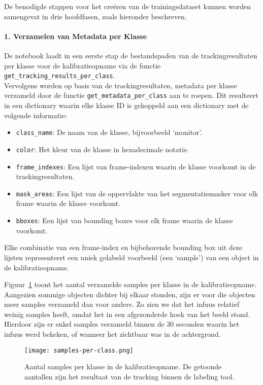 De benodigde stappen voor het creëren van de trainingsdataset kunnen worden samengevat in drie hoofdfasen, zoals hieronder beschreven.

\paragraph{1. Verzamelen van Metadata per Klasse}

De notebook laadt in een eerste stap de bestandspaden van de trackingresultaten per klasse 
voor de kalibratieopname via de functie\\ \texttt{get\_tracking\_results\_per\_class}.\\
Vervolgens worden op basis van de trackingresultaten, metadata per klasse verzameld door de functie \texttt{get\_metadata\_per\_class} aan te roepen.
Dit resulteert in een dictionary waarin elke klasse ID is gekoppeld aan een dictionary met de volgende informatie:
\begin{itemize}
    \item \texttt{class\_name}: De naam van de klasse, bijvoorbeeld `monitor'.
    \item \texttt{color}: Het kleur van de klasse in hexadecimale notatie.
    \item \texttt{frame\_indexes}: Een lijst van frame-indexen waarin de klasse voorkomt in de trackingresultaten.
    \item \texttt{mask\_areas}: Een lijst van de oppervlakte van het segmentatiemasker voor elk frame waarin de klasse voorkomt.
    \item \texttt{bboxes}: Een lijst van bounding boxes voor elk frame waarin de klasse voorkomt.
\end{itemize}
Elke combinatie van een frame-index en bijbehorende bounding box uit deze lijsten representeert 
een uniek gelabeld voorbeeld (een `sample') van een object in de kalibratieopname.

Figuur~\ref{fig:samples-per-class} toont het aantal verzamelde samples per klasse in de kalibratieopname. 
Aangezien sommige objecten dichter bij elkaar stonden, 
zijn er voor die objecten meer samples verzameld dan voor andere.
Zo zien we dat het infuus relatief weinig samples heeft, omdat het in een afgezonderde hoek van het beeld stond.
Hierdoor zijn er enkel samples verzameld binnen de 30 seconden waarin het infuus werd bekeken, 
of wanneer het zichtbaar was in de achtergrond.

\begin{figure}[H]
    \centering
    \texttt{[image: samples-per-class.png]}
    \caption[Aantal samples per klasse in de kalibratieopname]{
        \label{fig:samples-per-class}
        Aantal samples per klasse in de kalibratieopname.
        De getoonde aantallen zijn het resultaat van de tracking binnen de labeling tool.
      }
\end{figure}

